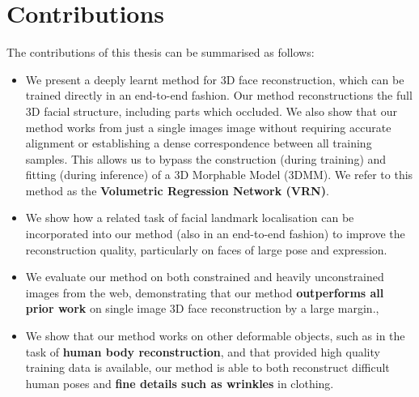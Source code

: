 
\section{Contributions}

The contributions of this thesis can be summarised as follows:

\begin{itemize}
\item %
  We present a deeply learnt method for 3D face reconstruction, which
  can be trained directly in an end-to-end fashion. Our method
  reconstructions the full 3D facial structure, including parts which
  occluded. We also show that our method works from just a single
  images image without requiring accurate alignment or establishing a
  dense correspondence between all training samples.  This allows us
  to bypass the construction (during training) and fitting (during
  inference) of a 3D Morphable Model (3DMM).  We refer to this method
  as the \textbf{Volumetric Regression Network (VRN)}.

\item %
  We show how a related task of facial landmark localisation can be
  incorporated into our method (also in an end-to-end fashion) to
  improve the reconstruction quality, particularly on faces of large
  pose and expression.

\item We evaluate our method on both constrained and heavily
  unconstrained images from the web, demonstrating that our method
  \textbf{outperforms all prior work} on single image 3D face
  reconstruction by a large margin.,

\item We show that our method works on other deformable objects, such
  as in the task of \textbf{human body reconstruction}, and that
  provided high quality training data is available, our method is able
  to both reconstruct difficult human poses and \textbf{fine details
    such as wrinkles} in clothing.

\end{itemize}

